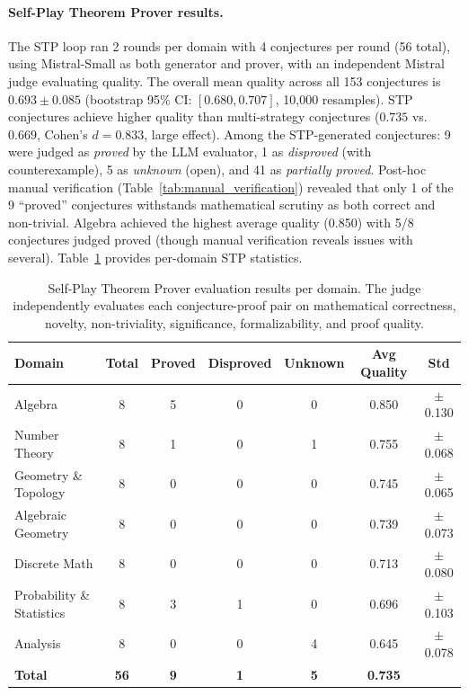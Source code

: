 \documentclass[11pt,a4paper]{article}
\begin{document}
\paragraph{Self-Play Theorem Prover results.}
The STP loop ran 2 rounds per domain with 4 conjectures per round (56 total), using Mistral-Small as both generator and prover, with an independent Mistral judge evaluating quality. The overall mean quality across all 153 conjectures is $0.693 \pm 0.085$ (bootstrap 95\% CI: $[0.680, 0.707]$, 10{,}000 resamples). STP conjectures achieve higher quality than multi-strategy conjectures ($0.735$ vs.\ $0.669$, Cohen's $d = 0.833$, large effect). Among the STP-generated conjectures: 9 were judged as \emph{proved} by the LLM evaluator, 1 as \emph{disproved} (with counterexample), 5 as \emph{unknown} (open), and 41 as \emph{partially proved}. Post-hoc manual verification (Table~\ref{tab:manual_verification}) revealed that only 1 of the 9 ``proved'' conjectures withstands mathematical scrutiny as both correct and non-trivial. Algebra achieved the highest average quality (0.850) with 5/8 conjectures judged proved (though manual verification reveals issues with several). Table~\ref{tab:stp_results} provides per-domain STP statistics.

\begin{table}[t]
\centering
\caption{Self-Play Theorem Prover evaluation results per domain. The judge independently evaluates each conjecture-proof pair on mathematical correctness, novelty, non-triviality, significance, formalizability, and proof quality.}
\label{tab:stp_results}
\small
\begin{tabular}{@{}lcccccc@{}}
\toprule
\textbf{Domain} & \textbf{Total} & \textbf{Proved} & \textbf{Disproved} & \textbf{Unknown} & \textbf{Avg Quality} & \textbf{Std} \\
\midrule
Algebra & 8 & 5 & 0 & 0 & 0.850 & $\pm$0.130 \\
Number Theory & 8 & 1 & 0 & 1 & 0.755 & $\pm$0.068 \\
Geometry \& Topology & 8 & 0 & 0 & 0 & 0.745 & $\pm$0.065 \\
Algebraic Geometry & 8 & 0 & 0 & 0 & 0.739 & $\pm$0.073 \\
Discrete Math & 8 & 0 & 0 & 0 & 0.713 & $\pm$0.080 \\
Probability \& Statistics & 8 & 3 & 1 & 0 & 0.696 & $\pm$0.103 \\
Analysis & 8 & 0 & 0 & 4 & 0.645 & $\pm$0.078 \\
\midrule
\textbf{Total} & \textbf{56} & \textbf{9} & \textbf{1} & \textbf{5} & \textbf{0.735} & \\
\bottomrule
\end{tabular}
\end{table}
\end{document}

